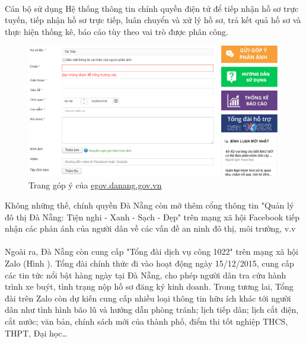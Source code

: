 \documentclass[a4paper]{article}
\begin{document}
\\
Cán bộ sử dụng Hệ thống thông tin chính quyền điện tử để tiếp nhận hồ sơ trực tuyến, tiếp nhận hồ sơ trực tiếp, luân chuyển và xử lý hồ sơ, trả kết quả hồ sơ và thực hiện thống kê, báo cáo tùy theo vai trò được phân công.
\begin{center}
    \begin{figure}[h]
    \begin{center}
     \includegraphics[scale=.55]{gopy-danang.PNG}
    \end{center}
    \caption{Trang góp ý của \href{egov.danang.gov.vn}{egov.danang.gov.vn}}
    \label{refhinh7}
    \end{figure}
\end{center}
Không những thế, chính quyền Đà Nẵng còn mở thêm cổng thông tin "Quản lý đô thị Đà Nẵng: Tiện nghi - Xanh - Sạch - Đẹp" trên mạng xã hội Facebook tiếp nhận các phản ánh của người dân về các vấn đề an ninh đô thị, môi trường, v.v\\
\\
Ngoài ra, Đà Nẵng còn cung cấp "Tổng đài dịch vụ công 1022" trên mạng xã hội Zalo (Hình ). Tổng đài chính thức đi vào hoạt động ngày 15/12/2015, cung cấp các tin tức nổi bật hàng ngày tại Đà Nẵng, cho phép người dân tra cứu hành trình xe buýt, tình trạng nộp hồ sơ đăng ký kinh doanh. Trong tương lai, Tổng đài trên Zalo còn dự kiến cung cấp nhiều loại thông tin hữu ích khác tới người dân như tình hình bão lũ và hướng dẫn phòng tránh; lịch tiếp dân; lịch cắt điện, cắt nước; văn bản, chính sách mới của thành phố, điểm thi tốt nghiệp THCS, THPT, Đại học… 
\end{document}
